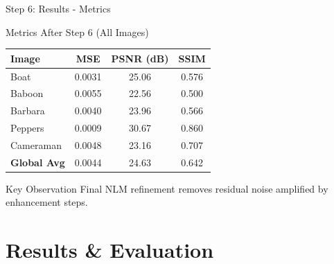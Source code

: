 \documentclass[aspectratio=169]{beamer}
\begin{document}
\begin{frame}{Step 6: Results - Metrics}
    \begin{block}{Metrics After Step 6 (All Images)}
        \begin{table}
            \centering
            \begin{tabular}{lccc}
                \toprule
                \textbf{Image} & \textbf{MSE} & \textbf{PSNR (dB)} & \textbf{SSIM} \\
                \midrule
                Boat & 0.0031 & 25.06 & 0.576 \\
                Baboon & 0.0055 & 22.56 & 0.500 \\
                Barbara & 0.0040 & 23.96 & 0.566 \\
                Peppers & 0.0009 & 30.67 & 0.860 \\
                Cameraman & 0.0048 & 23.16 & 0.707 \\
                \midrule
                \textbf{Global Avg} & 0.0044 & 24.63 & 0.642 \\
                \bottomrule
            \end{tabular}
        \end{table}
    \end{block}
    
    \begin{alertblock}{Key Observation}
        Final NLM refinement removes residual noise amplified by enhancement steps.
    \end{alertblock}
\end{frame}

\section{Results \& Evaluation}
\end{document}
